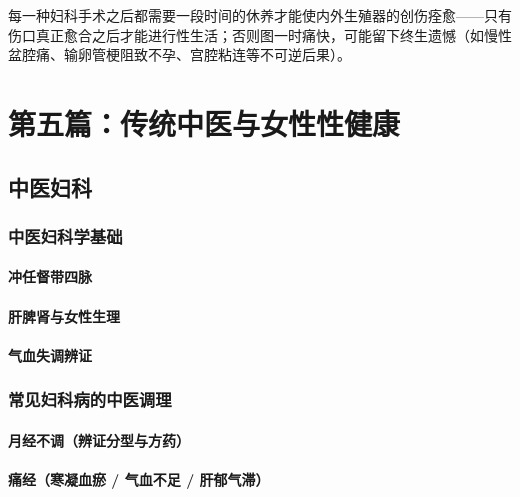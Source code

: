 \begin{enumerate}
\begin{tcolorbox}[colback=pink!5!white,colframe=red!50!black,title=贴心小叮咛]
每一种妇科手术之后都需要一段时间的休养才能使内外生殖器的创伤痊愈——只有伤口真正愈合之后才能进行性生活；否则图一时痛快，可能留下终生遗憾（如慢性盆腔痛、输卵管梗阻致不孕、宫腔粘连等不可逆后果）。
\end{tcolorbox}

\part{第五篇：传统中医与女性性健康}

\chapter{中医妇科}

\section{中医妇科学基础}
\subsection{冲任督带四脉}
\subsection{肝脾肾与女性生理}
\subsection{气血失调辨证}

\section{常见妇科病的中医调理}
\subsection{月经不调（辨证分型与方药）}
\subsection{痛经（寒凝血瘀 / 气血不足 / 肝郁气滞）}

\end{enumerate}
